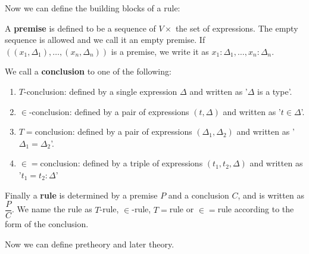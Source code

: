 Now we can define the building blocks of a rule:
\begin{definition}
    A \textbf{premise} is defined to be a sequence of $V \times$ the set of expressions.
    The empty sequence is allowed and we call it an empty premise.
    If $((x_1, \Delta_1), \dots, (x_n, \Delta_n))$ is a premise,
    we write it as $x_1 : \Delta_1, \dots, x_n : \Delta_n$.
\end{definition}
\begin{definition}
    We call a \textbf{conclusion} to one of the following:
    \begin{enumerate}
        \item $T$-conclusion: defined by a single expression $\Delta$
              and written as '$\Delta$ is a type'.
        \item $\in$-conclusion: defined by a pair of expressions $(t, \Delta)$
              and written as '$t \in \Delta$'.
        \item $T=$conclusion: defined by a pair of expressions $(\Delta_1, \Delta_2)$
              and written as '$\Delta_1 = \Delta_2$'.
        \item $\in=$conclusion: defined by a triple of expressions $(t_1, t_2, \Delta)$
              and written as '$t_1 = t_2 : \Delta$'
    \end{enumerate}
\end{definition}
Finally a \textbf{rule} is determined by a premise $P$ and a
conclusion $C$, and is written as $\dfrac{P}{C}$.
We name the rule as $T$-rule, $\in$-rule, $T=$rule or $\in=$rule
according to the form of the conclusion.

Now we can define pretheory and later theory.

